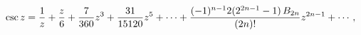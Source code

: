 \[\mathop{\csc\/}\nolimits z=\frac{1}{z}+\frac{z}{6}+\frac{7}{360}z^{3}+\frac{31%
}{15120}z^{5}+\cdots+\frac{(-1)^{n-1}2(2^{2n-1}-1)\mathop{B_{2n}\/}\nolimits}{%
(2n)!}z^{2n-1}+\cdots,\]